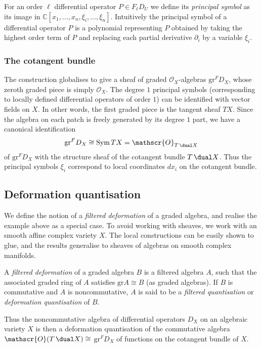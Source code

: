 For an order $\ell$ differential operator $P\in F_\ell D_U$ we define its
\emph{principal symbol} as its image in $\mathbb{C}[x_1,\dots,x_n,
\xi_i,\dots,\xi_n]$. Intuitively the principal symbol of a differential operator
$P$ is a polynomial representing $P$ obtained by taking the highest order term
of $P$ and replacing each partial derivative $\partial_i$ by a variable
$\xi_i$.

\subsubsection{The cotangent bundle}
The construction globalises to give a sheaf of graded \(\mathscr{O}_X\)-algebras
\(\text{gr}^FD_X\), whose zeroth graded piece is simply \(\mathscr{O}_X\). The
degree \(1\) principal symbols (corresponding to locally defined differential
operators of order \(1\)) can be identified with vector fields on \(X\). In
other words, the first graded piece is the tangent sheaf \(TX\). Since the 
algebra on each patch is freely generated by its degree \(1\) part, we have a
canonical identification 
\[\text{gr}^FD_X \cong \text{Sym}\,TX = \mathscr{O}_{T\,\dual X}\]
of \(\text{gr}^FD_X\) with the structure sheaf of the cotangent bundle \(T\,\dual
X\). Thus the principal symbols $\xi_i$ correspond to local coordinates $dx_i$
on the cotangent bundle.

\subsection{Deformation quantisation}
We define the notion of a \textit{filtered deformation} of a graded algebra, and
realise the example above as a special case. To avoid working with sheaves, we
work with an smooth affine complex variety \(X\). The local constructions can be
easily shown to glue, and the results generalise to sheaves of algebras on
smooth complex manifolds.

\begin{definition} \label{def-filtered-deformation}
    A \emph{filtered deformation}  of a graded algebra $B$ is a
    filtered algebra $A$, such that the associated graded ring of $A$ satisfies
    $\text{gr}A\cong B$ (as graded algebras). If $B$ is commutative and $A$ is
    noncommutative, $A$ is said to be a \emph{filtered quantisation} or
    \emph{deformation quantisation} of $B$.
\end{definition}

Thus the noncommutative algebra of differential operators $D_X$ on an algebraic
variety $X$ is then a deformation quantisation of the commutative algebra
$\mathscr{O}(T\,\dual X)\cong$ $\text{gr}^F D_X$ of functions on the cotangent
bundle of $X$.

